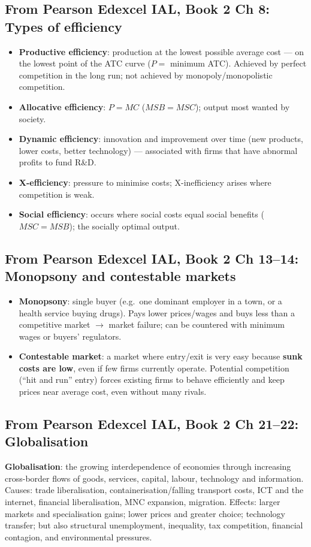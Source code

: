 \documentclass[a4paper,12pt]{article}
\newcommand{\needbold}[1]{\textcolor{red!70!black}{\textbf{#1}}}
\begin{document}
\subsection*{From Pearson Edexcel IAL, Book 2 Ch 8: Types of efficiency}\label{sec:add-efficiency}
\begin{itemize}
  \item \needbold{Productive efficiency}: production at the lowest possible average cost --- on the lowest point of the ATC curve ($P = $ minimum ATC). Achieved by perfect competition in the long run; not achieved by monopoly/monopolistic competition.
  \item \needbold{Allocative efficiency}: $P = MC$ ($MSB = MSC$); output most wanted by society.
  \item \needbold{Dynamic efficiency}: innovation and improvement over time (new products, lower costs, better technology) --- associated with firms that have abnormal profits to fund R\&D.
  \item \needbold{X-efficiency}: pressure to minimise costs; X-inefficiency arises where competition is weak.
  \item \needbold{Social efficiency}: occurs where social costs equal social benefits ($MSC = MSB$); the socially optimal output.
\end{itemize}

\subsection*{From Pearson Edexcel IAL, Book 2 Ch 13--14: Monopsony and contestable markets}
\begin{itemize}
  \item \needbold{Monopsony}: single buyer (e.g.\ one dominant employer in a town, or a health service buying drugs). Pays lower prices/wages and buys less than a competitive market $\to$ market failure; can be countered with minimum wages or buyers' regulators.
  \item \needbold{Contestable market}: a market where entry/exit is very easy because \textbf{sunk costs are low}, even if few firms currently operate. Potential competition (``hit and run'' entry) forces existing firms to behave efficiently and keep prices near average cost, even without many rivals.
\end{itemize}

\subsection*{From Pearson Edexcel IAL, Book 2 Ch 21--22: Globalisation}\label{sec:add-global}
\needbold{Globalisation}: the growing interdependence of economies through increasing cross-border flows of goods, services, capital, labour, technology and information. Causes: trade liberalisation, containerisation/falling transport costs, ICT and the internet, financial liberalisation, MNC expansion, migration. Effects: larger markets and specialisation gains; lower prices and greater choice; technology transfer; but also structural unemployment, inequality, tax competition, financial contagion, and environmental pressures.
\end{document}
